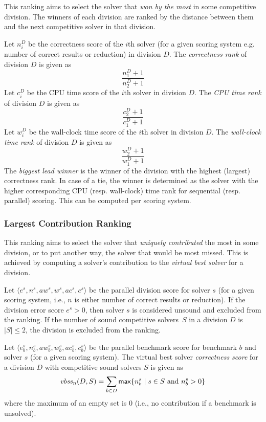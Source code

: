 \documentclass[12pt]{article}
\begin{document}
This ranking aims to select the solver that \emph{won by the most} in
some competitive division. The winners of each division are ranked by
the distance between them and the next competitive solver in that
division.

Let $n_i^D$ be the correctness score of the $i$th solver (for a given scoring
system e.g. number of correct results or reduction) in division $D$.
The \emph{correctness rank} of division $D$ is given as
\[
\frac{n_1^D+1}{n_2^D+1}
\]
Let $c_i^D$ be the CPU time score of the $i$th solver in division $D$.
The \emph{CPU time rank} of division $D$ is given as
\vspace{-1ex}
\[
\frac{c_2^D+1}{c_1^D+1}
\]
Let $w_i^D$ be the wall-clock time score of the $i$th solver in division $D$.
The \emph{wall-clock time rank} of division $D$ is given as
\vspace{-1ex}
\[
\frac{w_2^D+1}{w_1^D+1}
\]
The \emph{biggest lead winner} is the winner of the division with the highest
(largest) correctness rank. In case of a tie, the winner is determined as the
solver with the higher corresponding CPU (resp. wall-clock) time rank for
sequential (resp. parallel) scoring.
This can be computed per scoring system.

\subsubsection{Largest Contribution Ranking}

This ranking aims to select the solver that \emph{uniquely
contributed} the most in some division, or to put another way, the
solver that would be most missed. This is achieved by computing a
solver's contribution to the \emph{virtual best solver} for a
division.

Let $\langle e^s, n^s, \mathit{aw}^s, w^s, \mathit{ac}^s, c^s \rangle$ be the parallel division score
for solver $s$ (for a given scoring system, i.e., $n$ is either number of correct
results or reduction).
If the division error score $e^s > 0$, then solver $s$ is considered unsound
and excluded from the ranking.
If the number of sound competitive solvers~$S$ in a division $D$ is $|S| \leq 2$,
the division is excluded from the ranking.

Let $\langle e_b^s, n_b^s, \mathit{aw}_b^s, w_b^s, \mathit{ac}_b^s, c_b^s \rangle$ be the parallel benchmark
score for benchmark $b$ and solver $s$ (for a given scoring system).
The virtual best solver \emph{correctness score} for a division $D$ with
competitive sound solvers $S$ is given as
\[
\mathit{vbss}_n(D,S) = \sum_{b \in D} {\sf max}\{ n_b^s \mid s \in S \text{ and } n_b^s > 0 \}
\]
where the maximum of an empty set is 0 (i.e., no contribution if a benchmark
is unsolved).
\end{document}
